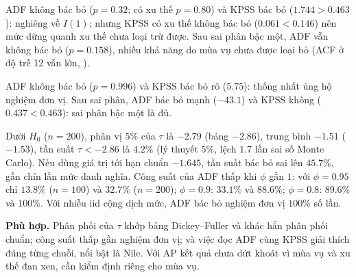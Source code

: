  ADF không bác bỏ ($p=0.32$; có xu thế $p=0.80$) và KPSS bác bỏ ($1.744>0.463$): nghiêng về $I(1)$; nhưng KPSS có xu thế không bác bỏ ($0.061<0.146$) nên mức dừng quanh xu thế chưa loại trừ được. Sau sai phân bậc một, ADF vẫn không bác bỏ ($p=0.158$), nhiều khả năng do mùa vụ chưa được loại bỏ (ACF ở độ trễ 12 vẫn lớn, ).

 ADF không bác bỏ ($p=0.996$) và KPSS bác bỏ rõ ($5.75$): thống nhất ủng hộ nghiệm đơn vị. Sau sai phân, ADF bác bỏ mạnh ($-43.1$) và KPSS không ($0.437<0.463$): sai phân bậc một là đủ.

 Dưới $H_0$ ($n=200$), phân vị $5\%$ của $\tau$ là $-2.79$ (bảng $-2.86$), trung bình $-1.51$ ($-1.53$), tần suất $\tau<-2.86$ là $4.2\%$ (lý thuyết $5\%$, lệch $1.7$ lần sai số Monte Carlo). Nếu dùng giá trị tới hạn chuẩn $-1.645$, tần suất bác bỏ sai lên $45.7\%$, gần chín lần mức danh nghĩa. Công suất của ADF thấp khi $\phi$ gần $1$: với $\phi=0.95$ chỉ $13.8\%$ ($n=100$) và $32.7\%$ ($n=200$); $\phi=0.9$: $33.1\%$ và $88.6\%$; $\phi=0.8$: $89.6\%$ và $100\%$. Với nhiễu iid cộng dịch mức, ADF bác bỏ nghiệm đơn vị $100\%$ số lần.

 \textbf{Phù hợp.} Phân phối của $\tau$ khớp bảng Dickey--Fuller và khác hẳn phân phối chuẩn; công suất thấp gần nghiệm đơn vị; và việc đọc ADF cùng KPSS giải thích đúng từng chuỗi, nổi bật là Nile. Với AP kết quả chưa dứt khoát vì mùa vụ và xu thế đan xen, cần kiểm định riêng cho mùa vụ.

